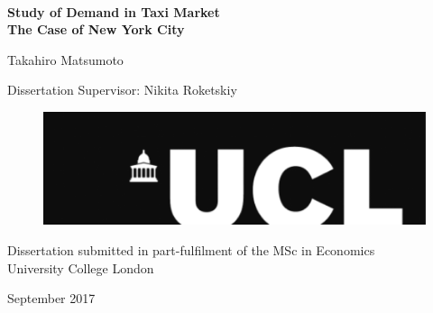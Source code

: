 
\thispagestyle{empty}

{%
\centering
\Large

~\vspace{\fill}

{\LARGE \bf
Study of Demand in Taxi Market \\The Case of New York City\\
}



\vspace{2.5cm}

{\LARGE
Takahiro Matsumoto
}

\vspace{1.5cm}

{\Large
Dissertation Supervisor: Nikita Roketskiy
}

\vspace{1.5cm}

\begin{figure}[h]
\centering
\includegraphics[width=12cm]{Figures/UCL.png}
\end{figure}




Dissertation submitted in part-fulfilment of the MSc in Economics\\

\vspace{1.0cm}
University College London



\vspace{\fill}

September 2017



}%